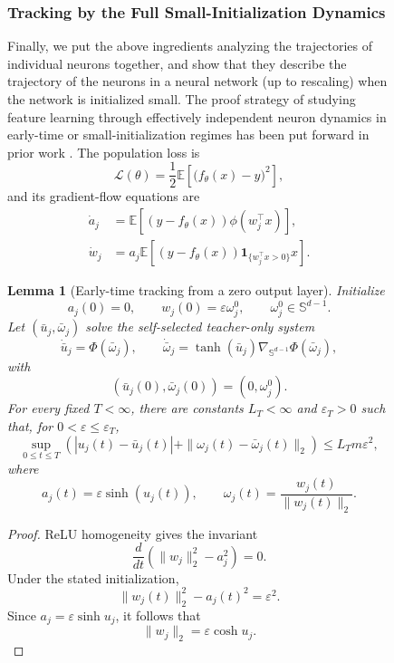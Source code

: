 \documentclass{article}
\newcounter{initialization}[section]
\newtheorem{lemma}[lemma]{Lemma}
\begin{document}
\begin{figure}
\subsubsection{Tracking by the Full Small-Initialization Dynamics}

Finally, we put the above ingredients analyzing the trajectories of individual neurons together, and show that they describe the trajectory of the neurons in a neural network (up to rescaling) when the network is initialized small.
The proof strategy of studying feature learning through
effectively independent neuron dynamics in early-time or
small-initialization regimes has been put forward in prior work
\citep{abbe2022merged,min2024early,glasgow2024sgd}.
The population loss is
\[
    \mathcal L(\theta)
    =
    \frac12
    \mathbb E\left[
        \bigl(f_\theta({x})-{y}\bigr)^2
    \right],
\]
and its gradient-flow equations are
\begin{align*}
    \dot a_j
    &=
    \mathbb E\left[
        ({y}-f_\theta({x}))
        \phi(w_j^\top{x})
    \right],\\
    \dot w_j
    &=
    a_j
    \mathbb E\left[
        ({y}-f_\theta({x}))
        \mathbf 1_{\{w_j^\top{x}>0\}}{x}
    \right].
\end{align*}

\begin{lemma}[Early-time tracking from a zero output layer]
\label{lem:early-time-tracking}
Initialize
\[
    a_j(0)=0,
    \qquad
    w_j(0)=\varepsilon {\omega_j^0},
    \qquad
    {\omega_j^0}\in\mathbb S^{d-1}.
\]
Let $(\bar u_j,{\bar\omega_j})$ solve the self-selected teacher-only system
\[
    \dot{\bar u}_j
    =
    \Phi({\bar\omega_j}),
    \qquad
    {\dot{\bar\omega}_j}
    =
    \tanh(\bar u_j)
    \nabla_{\mathbb S^{d-1}}\Phi({\bar\omega_j}),
\]
with
\[
    (\bar u_j(0),{\bar\omega_j(0)})
    =
    (0,{\omega_j^0}).
\]
For every fixed $T<\infty$, there are constants $L_T<\infty$ and
$\varepsilon_T>0$ such that, for $0<\varepsilon\leq\varepsilon_T$,
\[
    \sup_{0\leq t\leq T}
    \left(
        |u_j(t)-\bar u_j(t)|
        +
        \|{\omega_j(t)-\bar\omega_j(t)}\|_2
    \right)
    \leq
    L_Tm\varepsilon^2,
\]
where
\[
    a_j(t)=\varepsilon\sinh(u_j(t)),
    \qquad
    {\omega_j(t)}=\frac{w_j(t)}{\|w_j(t)\|_2}.
\]
\end{lemma}

\begin{proof}
ReLU homogeneity gives the invariant
\[
    \frac{d}{dt}
    \left(
        \|w_j\|_2^2-a_j^2
    \right)
    =
    0.
\]
Under the stated initialization,
\[
    \|w_j(t)\|_2^2-a_j(t)^2
    =
    \varepsilon^2.
\]
Since $a_j=\varepsilon\sinh u_j$, it follows that
\[
    \|w_j\|_2
    =
    \varepsilon\cosh u_j.
\]


\end{proof}
\end{figure}
\end{document}
